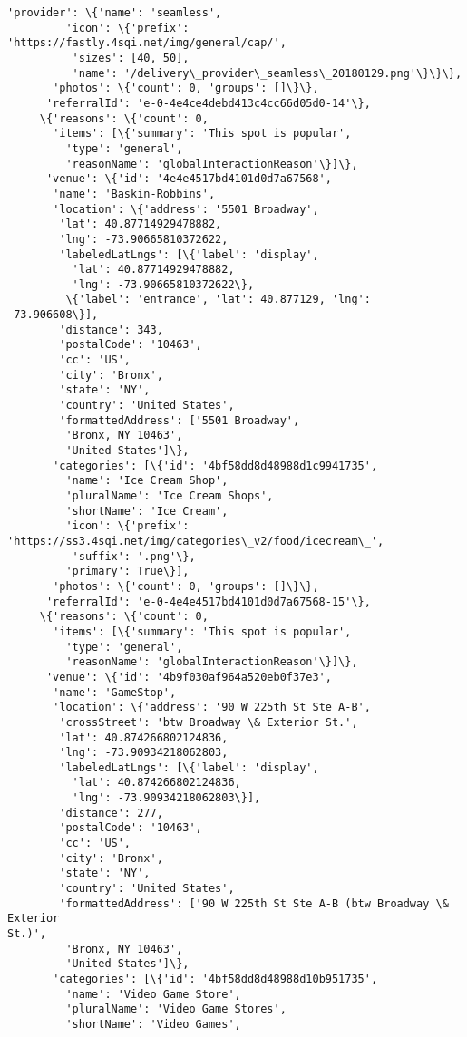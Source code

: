 \documentclass[11pt]{article}
\begin{document}
\begin{tcolorbox}[breakable, size=fbox, boxrule=.5pt, pad at break*=1mm, opacityfill=0]
\begin{Verbatim}[commandchars=\\\{\}]
        'provider': \{'name': 'seamless',
         'icon': \{'prefix': 'https://fastly.4sqi.net/img/general/cap/',
          'sizes': [40, 50],
          'name': '/delivery\_provider\_seamless\_20180129.png'\}\}\},
       'photos': \{'count': 0, 'groups': []\}\},
      'referralId': 'e-0-4e4ce4debd413c4cc66d05d0-14'\},
     \{'reasons': \{'count': 0,
       'items': [\{'summary': 'This spot is popular',
         'type': 'general',
         'reasonName': 'globalInteractionReason'\}]\},
      'venue': \{'id': '4e4e4517bd4101d0d7a67568',
       'name': 'Baskin-Robbins',
       'location': \{'address': '5501 Broadway',
        'lat': 40.87714929478882,
        'lng': -73.90665810372622,
        'labeledLatLngs': [\{'label': 'display',
          'lat': 40.87714929478882,
          'lng': -73.90665810372622\},
         \{'label': 'entrance', 'lat': 40.877129, 'lng': -73.906608\}],
        'distance': 343,
        'postalCode': '10463',
        'cc': 'US',
        'city': 'Bronx',
        'state': 'NY',
        'country': 'United States',
        'formattedAddress': ['5501 Broadway',
         'Bronx, NY 10463',
         'United States']\},
       'categories': [\{'id': '4bf58dd8d48988d1c9941735',
         'name': 'Ice Cream Shop',
         'pluralName': 'Ice Cream Shops',
         'shortName': 'Ice Cream',
         'icon': \{'prefix':
'https://ss3.4sqi.net/img/categories\_v2/food/icecream\_',
          'suffix': '.png'\},
         'primary': True\}],
       'photos': \{'count': 0, 'groups': []\}\},
      'referralId': 'e-0-4e4e4517bd4101d0d7a67568-15'\},
     \{'reasons': \{'count': 0,
       'items': [\{'summary': 'This spot is popular',
         'type': 'general',
         'reasonName': 'globalInteractionReason'\}]\},
      'venue': \{'id': '4b9f030af964a520eb0f37e3',
       'name': 'GameStop',
       'location': \{'address': '90 W 225th St Ste A-B',
        'crossStreet': 'btw Broadway \& Exterior St.',
        'lat': 40.874266802124836,
        'lng': -73.90934218062803,
        'labeledLatLngs': [\{'label': 'display',
          'lat': 40.874266802124836,
          'lng': -73.90934218062803\}],
        'distance': 277,
        'postalCode': '10463',
        'cc': 'US',
        'city': 'Bronx',
        'state': 'NY',
        'country': 'United States',
        'formattedAddress': ['90 W 225th St Ste A-B (btw Broadway \& Exterior
St.)',
         'Bronx, NY 10463',
         'United States']\},
       'categories': [\{'id': '4bf58dd8d48988d10b951735',
         'name': 'Video Game Store',
         'pluralName': 'Video Game Stores',
         'shortName': 'Video Games',

\end{Verbatim}
\end{tcolorbox}
\end{document}

